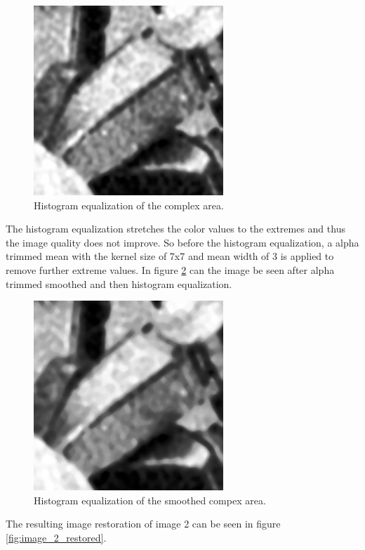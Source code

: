 \begin{figure}[H]
\centering
\includegraphics[width = 0.5 \linewidth]{graphics/complex2_histeq.png}
\caption{Histogram equalization of the complex area.}
\label{fig:complex2_histeq}
\end{figure}


The histogram equalization stretches the color values to the extremes and thus the image quality does not improve.
So before the histogram equalization, a alpha trimmed mean with the kernel size of 7x7 and mean width of 3 is applied to remove further extreme values.
In figure \ref{fig:complex2_histeq_smoothed} can the image be seen after alpha trimmed smoothed and then histogram equalization.

\begin{figure}[H]
\centering
\includegraphics[width = 0.5 \linewidth]{graphics/complex2_histeq_smoothed.png}
\caption{Histogram equalization of the smoothed compex area.}
\label{fig:complex2_histeq_smoothed}
\end{figure}

The resulting image restoration of image 2 can be seen in figure \ref{fig:image_2_restored}.

